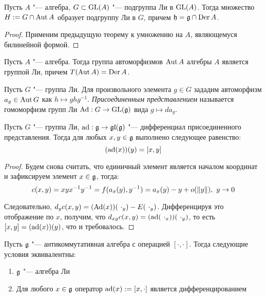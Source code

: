 \begin{corollary}
	Пусть $A$ "--- алгебра, $G \subset \operatorname{GL}(A)$ "--- подгруппа Ли в $\operatorname{GL}(A)$. Тогда множество $H := G \cap \operatorname{Aut}{A}$ образует подгруппу Ли в $G$, причем $\mathfrak h = \mathfrak g \cap \operatorname{Der}{A}$.
\end{corollary}

\begin{proof}
	Применим предыдущую теорему к умножению на $A$, являющемуся билинейной формой.
\end{proof}

\begin{corollary}
	Пусть $A$ "--- алгебра. Тогда группа автоморфизмов $\operatorname{Aut}{A}$ алгебры $A$ является группой Ли, причем $T(\operatorname{Aut}{A}) = \operatorname{Der}{A}$.
\end{corollary}

\begin{definition}
	Пусть $G$ "--- группа Ли. Для произвольного элемента $g \in G$ зададим автоморфизм $a_g \in \operatorname{Aut}{G}$ как $h \mapsto ghg^{-1}$. \textit{Присоединенным представлением} называется гомоморфизм групп Ли $\operatorname{Ad}: G \to \operatorname{GL}(\mathfrak g)$ вида $g \mapsto da_g$.
\end{definition}

\begin{theorem}
	Пусть $G$ "--- группа Ли, $\operatorname{ad}: \mathfrak g \to \mathfrak{gl}(\mathfrak g)$ "--- дифференциал присоединенного представления. Тогда для любых $x, y \in \mathfrak{g}$ выполнено следующее равенство:
	\[(\operatorname{ad} (x))(y) = [x, y]\]
\end{theorem}

\begin{proof}
	Будем снова считать, что единичный элемент является началом координат и зафиксируем элемент $x \in \mathfrak{g}$, тогда:
	\[c(x, y) = xyx^{-1}y^{-1} = f{(a_x(y), y^{-1})} = a_x(y) - y + o(\|y\|),~y \to 0\]
	
	Следовательно, $d_yc(x, y) = (\operatorname{Ad}(x))(\,\,\cdot_y) - E(\,\,\cdot_y)$. Дифференцируя это отображение по $x$, получим, что $d_{xy}c(x, y) = (\operatorname{ad}(\,\,\cdot_x))(\,\,\cdot_y)$, то есть $[x, y] = (\operatorname{ad} (x))(y)$, что и требовалось.
\end{proof}

\begin{theorem}
	Пусть $\mathfrak g$ "--- антикоммутативная алгебра с операцией $[\cdot, \cdot]$. Тогда следующие условия эквивалентны:
	\begin{enumerate}
		\item $\mathfrak g$ "--- алгебра Ли
		\item Для любого $x \in \mathfrak g$ оператор $\operatorname{ad} (x) := [x, \cdot]$ является дифференцированием
	\end{enumerate}
\end{theorem}

